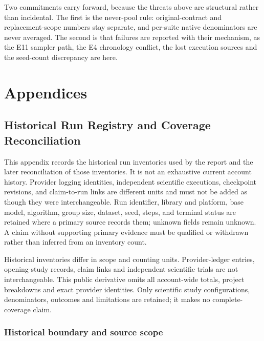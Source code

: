 \documentclass[12pt,a4paper]{report}
\begin{document}
Two commitments carry forward, because the threats above are structural
rather than incidental. The first is the never-pool rule:
original-contract and replacement-scope numbers stay separate, and
per-suite native denominators are never averaged. The second is that
failures are reported with their mechanism, as the E11 sampler path, the
E4 chronology conflict, the lost execution sources and the seed-count
discrepancy are here.



\cleardoublepage
{}
{}




\appendix


\part{Appendices}


\chapter{Historical Run Registry and Coverage
Reconciliation}\label{historical-run-registry-and-coverage-reconciliation}

This appendix records the historical run inventories used by the report
and the later reconciliation of those inventories. It is not an
exhaustive current account history. Provider logging identities,
independent scientific executions, checkpoint revisions, and
claim-to-run links are different units and must not be added as though
they were interchangeable. Run identifier, library and platform, base
model, algorithm, group size, dataset, seed, steps, and terminal status
are retained where a primary source records them; unknown fields remain
unknown. A claim without supporting primary evidence must be qualified
or withdrawn rather than inferred from an inventory count.

Historical inventories differ in scope and counting units.
Provider-ledger entries, opening-study records, claim links and
independent scientific trials are not interchangeable. This public
derivative omits all account-wide totals, project breakdowns and exact
provider identities. Only scientific study configurations, denominators,
outcomes and limitations are retained; it makes no complete-coverage
claim.

\section{Historical boundary and source
scope}\label{historical-boundary-and-source-scope}
\end{document}
